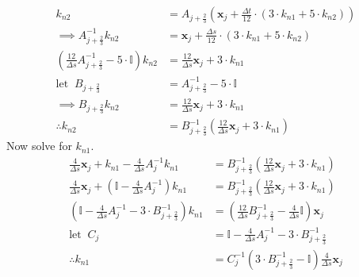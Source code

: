 \documentclass{article}
\begin{document}
\begin{align*}
	k_{n2}                                                                          & = A_{j+\frac{2}{3}}\left(\bm{x}_j + \frac{\Delta t}{12}\cdot(3\cdot k_{n1} + 5\cdot k_{n2}) \right) \\
	\implies A_{j+\frac{2}{3}}^{-1}k_{n2}                                           & = \bm{x}_j + \frac{\Delta s}{12}\cdot(3\cdot k_{n1} + 5\cdot k_{n2})                                \\
	\left(\frac{12}{\Delta s}A_{j+\frac{2}{3}}^{-1} - 5\cdot\mathbb{I}\right)k_{n2} & = \frac{12}{\Delta s}\bm{x}_j + 3\cdot k_{n1}                                                       \\
	\mathrm{let\;\;} B_{j+\frac{2}{3}}                                              & = A_{j+\frac{2}{3}}^{-1}-5\cdot\mathbb{I}                                                           \\
	\implies B_{j+\frac{2}{3}} k_{n2}                                               & = \frac{12}{\Delta s}\bm{x}_j + 3\cdot k_{n1}                                                       \\
	\therefore k_{n2}                                                               & = B_{j+\frac{2}{3}}^{-1}\left(\frac{12}{\Delta s}\bm{x}_j + 3\cdot k_{n1} \right)
\end{align*}
Now solve for $k_{n1}$.
\begin{align*}
	\frac{4}{\Delta s}\bm{x}_j + k_{n1} - \frac{4}{\Delta s}A_j^{-1}k_{n1}                     & = B_{j+\frac{2}{3}}^{-1}\left(\frac{12}{\Delta s}\bm{x}_j + 3\cdot k_{n1} \right)                \\
	\frac{4}{\Delta s}\bm{x}_j + \left(\mathbb{I} -\frac{4}{\Delta s}A_j^{-1}\right)k_{n1}     & = B_{j+\frac{2}{3}}^{-1}\left(\frac{12}{\Delta s}\bm{x}_j + 3\cdot k_{n1} \right)                \\
	\left(\mathbb{I} - \frac{4}{\Delta s}A_j^{-1} - 3\cdot B_{j+\frac{2}{3}}^{-1}\right)k_{n1} & = \left(\frac{12}{\Delta s} B_{j+\frac{2}{3}}^{-1} - \frac{4}{\Delta s}\mathbb{I}\right)\bm{x}_j \\
	\mathrm{let\;\;} C_j                                                                       & = \mathbb{I} - \frac{4}{\Delta s}A_j^{-1} - 3\cdot B_{j+\frac{2}{3}}^{-1}                        \\
	\therefore k_{n1}                                                                          & = C_j^{-1}\left(3\cdot B_{j+\frac{2}{3}}^{-1} - \mathbb{I}\right)\frac{4}{\Delta s}\bm{x}_j
\end{align*}
\end{document}
